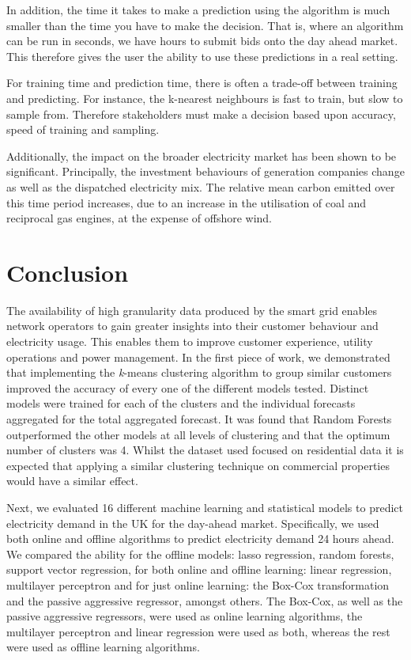 In addition, the time it takes to make a prediction using the algorithm is much smaller than the time you have to make the decision. That is, where an algorithm can be run in seconds, we have hours to submit bids onto the day ahead market. This therefore gives the user the ability to use these predictions in a real setting.

For training time and prediction time, there is often a trade-off between training and predicting. For instance, the k-nearest neighbours is fast to train, but slow to sample from. Therefore stakeholders must make a decision based upon accuracy, speed of training and sampling. 

Additionally, the impact on the broader electricity market has been shown to be significant. Principally, the investment behaviours of generation companies change as well as the dispatched electricity mix. The relative mean carbon emitted over this time period increases, due to an increase in the utilisation of coal and reciprocal gas engines, at the expense of offshore wind.




\section{Conclusion}
\label{sec:conclusion}


The availability of high granularity data produced by the smart grid enables network operators to gain greater insights into their customer behaviour and electricity usage. This enables them to improve customer experience, utility operations and power management. In the first piece of work, we demonstrated that implementing the \textit{k}-means clustering algorithm to group similar customers improved the accuracy of every one of the different models tested. Distinct models were trained for each of the clusters and the individual forecasts aggregated for the total aggregated forecast. It was found that Random Forests outperformed the other models at all levels of clustering and that the optimum number of clusters was 4. Whilst the dataset used focused on residential data it is expected that applying a similar clustering technique on commercial properties would have a similar effect.


Next, we evaluated 16 different machine learning and statistical models to predict electricity demand in the UK for the day-ahead market. Specifically, we used both online and offline algorithms to predict electricity demand 24 hours ahead. We compared the ability for the offline models: lasso regression, random forests, support vector regression, for both online and offline learning: linear regression, multilayer perceptron and for just online learning: the Box-Cox transformation and the passive aggressive regressor, amongst others. The Box-Cox, as well as the passive aggressive regressors, were used as online learning algorithms, the multilayer perceptron and linear regression were used as both, whereas the rest were used as offline learning algorithms.

